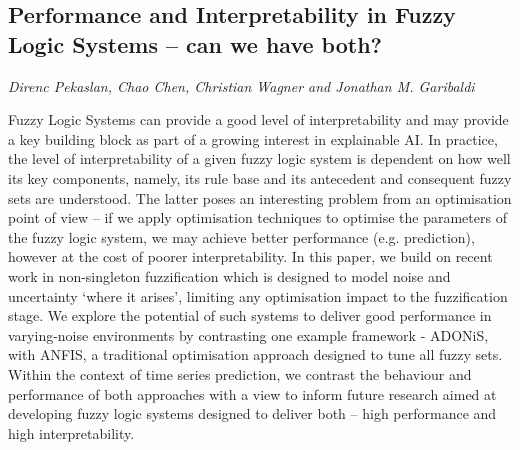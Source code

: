 \documentclass[../booklet.tex]{subfiles}
\begin{document}
\subsection[Performance and Interpretability in Fuzzy Logic Systems – can we have both?. {\it Direnc Pekaslan, Chao Chen, Christian Wagner and Jonathan M. Garibaldi}]{Performance and Interpretability in Fuzzy Logic Systems – can we have both?}
   

\begin{center}
  {\it Direnc Pekaslan, Chao Chen, Christian Wagner and Jonathan M. Garibaldi}
\end{center}

\vskip 0.8cm



Fuzzy Logic Systems can provide a good level of interpretability and may provide a key building block as part of a growing interest in explainable AI. In practice, the level of interpretability of a given fuzzy logic system is dependent on how well its key components, namely, its rule base and its antecedent and consequent fuzzy sets are understood. The latter poses an interesting problem from an optimisation point of view -- if we apply optimisation techniques to optimise the parameters of the fuzzy logic system, we may achieve better performance (e.g. prediction), however at the cost of poorer interpretability. In this paper, we build on recent work in non-singleton fuzzification which is designed to model noise and uncertainty `where it arises', limiting any optimisation impact to the fuzzification stage. We explore the potential of such systems to deliver good performance in varying-noise environments by contrasting one example framework - ADONiS, with ANFIS, a traditional optimisation approach designed to tune all fuzzy sets. Within the context of time series prediction, we contrast the behaviour and performance of both approaches with a view to inform future research aimed at developing fuzzy logic systems designed to deliver both -- high performance and high interpretability. 

\end{document}
